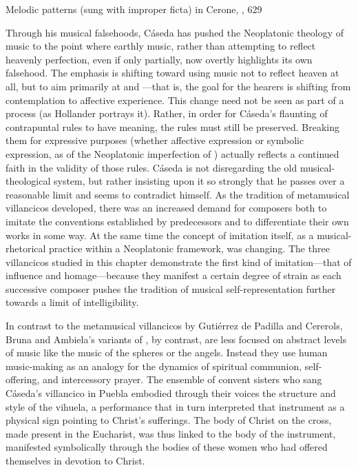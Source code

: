 {Melodic patterns  (sung with improper
ficta) in Cerone, , 629} 

Through his musical falsehoods, Cáseda has pushed the Neoplatonic theology of
music to the point where earthly music, rather than attempting to reflect
heavenly perfection, even if only partially, now overtly highlights its own
falsehood.
The emphasis is shifting toward using music not to reflect heaven at all, but
to aim primarily at  and ---that is, the goal for the hearers is shifting from contemplation to
affective experience.
This change need not be seen as part of a  process (as
Hollander portrays it).
Rather, in order for Cáseda's flaunting of contrapuntal rules to have meaning,
the rules must still be preserved.
Breaking them for expressive purposes (whether affective expression or symbolic
expression, as of the Neoplatonic imperfection of ) actually reflects a continued faith in the validity of those
rules.
Cáseda is not disregarding the old musical-theological system, but rather
insisting upon it so strongly that he passes over a reasonable limit and seems
to contradict himself.
As the tradition of metamusical villancicos developed, there was an increased
demand for composers both to imitate the conventions established by
predecessors and to differentiate their own works in some way. 
At the same time the concept of imitation itself, as a musical-rhetorical
practice within a Neoplatonic framework, was changing.
The three villancicos studied in this chapter demonstrate the first kind of
imitation---that of influence and homage---because they manifest a certain
degree of strain as each successive composer pushes the tradition of musical
self-representation further towards a limit of intelligibility.

In contrast to the metamusical villancicos by Gutiérrez de Padilla and
Cererols, Bruna and Ambiela's variants of , by
contrast, are less focused on abstract levels of music like the music of the
spheres or the angels.
Instead they use human music-making as an analogy for the dynamics of spiritual
communion, self-offering, and intercessory prayer.
The ensemble of convent sisters who sang Cáseda's villancico in Puebla embodied
through their voices the structure and style of the vihuela, a performance that
in turn interpreted that instrument as a physical sign pointing to Christ's
sufferings.
The body of Christ on the cross, made present in the Eucharist, was thus linked
to the body of the instrument, manifested symbolically through the bodies of
these women who had offered themselves in devotion to Christ.

